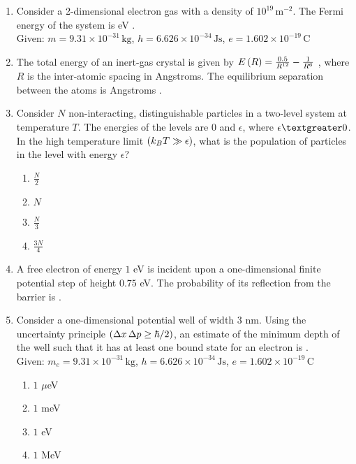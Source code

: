 \documentclass[journal,12pt,twocolumn]{IEEEtran}
\theoremstyle{remark}
\begin{document}
\begin{enumerate}[start=27]
    \item 
    Consider a 2-dimensional electron gas with a density of $10^{19} \, \text{m}^{-2}$. The Fermi energy of the system is  eV . \\
    Given: $m = 9.31 \times 10^{-31} \, \text{kg}$, $h = 6.626 \times 10^{-34} \, \text{Js}$, $e = 1.602 \times 10^{-19} \, \text{C}$
    
    \item
    The total energy of an inert-gas crystal is given by $E\left(R\right) = \frac{0.5}{R^{12}} - \frac{1}{R^6}$ , where $R$ is the inter-atomic spacing in Angstroms. The equilibrium separation between the atoms is Angstroms .
    
    \item 
    Consider $N$ non-interacting, distinguishable particles in a two-level system at temperature $T$. The energies of the levels are $0$ and $\epsilon$, where $\epsilon \textgreater 0$. In the high temperature limit $\left(k_B T \gg \epsilon\right)$, what is the population of particles in the level with energy $\epsilon$?
    \begin{enumerate}
        \item $\frac{N}{2}$
        \item $N$
        \item $\frac{N}{3}$
        \item $\frac{3N}{4}$
    \end{enumerate}
    
    \item 
    A free electron of energy $1$ eV is incident upon a one-dimensional finite potential step of height $0.75$ eV. The probability of its reflection from the barrier is .

    \item 
    Consider a one-dimensional potential well of width $3$ nm. Using the uncertainty principle $\left(\Delta x \, \Delta p \geq \hbar/2\right)$, an estimate of the minimum depth of the well such that it has at least one bound state for an electron is . \\
    Given: $m_e = 9.31 \times 10^{-31} \, \text{kg}$, $h = 6.626 \times 10^{-34} \, \text{Js}$, $e = 1.602 \times 10^{-19} \, \text{C}$
    \begin{enumerate}
        \item $1$ $\mu$eV
        \item $1$ meV
        \item $1$ eV
        \item $1$ MeV
    \end{enumerate}
    

\end{enumerate}
\end{document}

